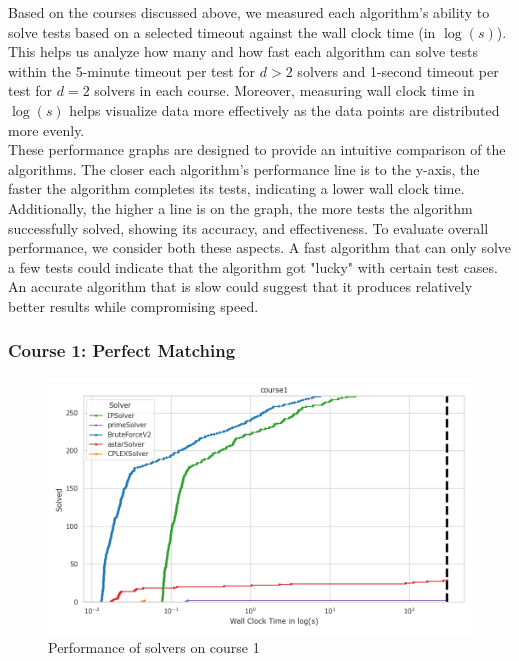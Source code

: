 
Based on the courses discussed above, we measured each algorithm's ability to solve tests based on a selected timeout against the wall clock time (in $\log(s)$). This helps us analyze how many and how fast each algorithm can solve tests within the 5-minute timeout per test for $d>2$ solvers and 1-second timeout per test for $d=2$ solvers in each course. Moreover, measuring wall clock time in $\log(s)$ helps visualize data more effectively as the data points are distributed more evenly.  \\
These performance graphs are designed to provide an intuitive comparison of the algorithms. The closer each algorithm's performance line is to the y-axis, the faster the algorithm completes its tests, indicating a lower wall clock time. Additionally, the higher a line is on the graph, the more tests the algorithm successfully solved, showing its accuracy, and effectiveness. To evaluate overall performance, we consider both these aspects. A fast algorithm that can only solve a few tests could indicate that the algorithm got "lucky" with certain test cases. An accurate algorithm that is slow could suggest that it produces relatively better results while compromising speed.


\subsubsection*{Course 1: Perfect Matching}

\begin{figure}[h!]
    \centering
    \includegraphics[width=\textwidth]{Graphs/course1.png}
    \caption{Performance of solvers on course 1}
\end{figure}

